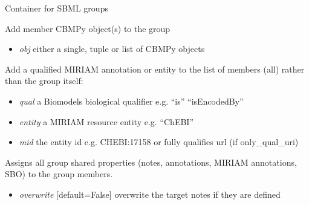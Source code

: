 \documentclass[a4paper,11pt,english]{sphinxmanual}
\begin{document}

\begin{fulllineitems}
\label{modules_doc:cbmpy.CBModel.Group}
Container for SBML groups

\begin{fulllineitems}
\label{modules_doc:cbmpy.CBModel.Group.addMember}
Add member CBMPy object(s) to the group
\begin{itemize}
\item {} 
\emph{obj} either a single, tuple or list of CBMPy objects

\end{itemize}

\end{fulllineitems}


\begin{fulllineitems}
\label{modules_doc:cbmpy.CBModel.Group.addSharedMIRIAMannotation}
Add a qualified MIRIAM annotation or entity to the list of members (all) rather than the group itself:
\begin{itemize}
\item {} 
\emph{qual} a Biomodels biological qualifier e.g. ``is'' ``isEncodedBy''

\item {} 
\emph{entity} a MIRIAM resource entity e.g. ``ChEBI''

\item {} 
\emph{mid} the entity id e.g. CHEBI:17158 or fully qualifies url (if only\_qual\_uri)

\end{itemize}

\end{fulllineitems}


\begin{fulllineitems}
\label{modules_doc:cbmpy.CBModel.Group.assignAllSharedPropertiesToMembers}
Assigns all group shared properties (notes, annotations, MIRIAM annotations, SBO) to the group members.
\begin{itemize}
\item {} 
\emph{overwrite} {[}default=False{]} overwrite the target notes if they are defined


\end{itemize}
\end{fulllineitems}
\end{fulllineitems}
\end{document}
